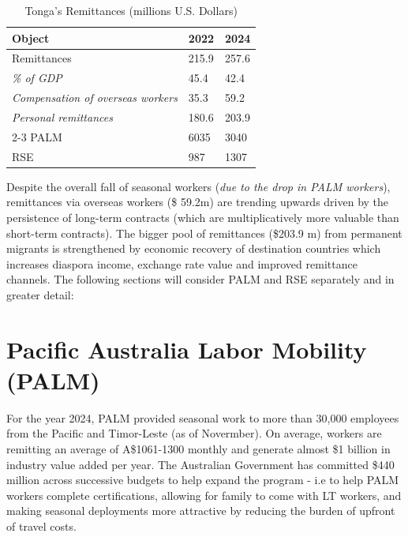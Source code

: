 \documentclass[9pt,a4paper,twocolumn,twoside]{tau-class/tau}
\begin{document}
    	        \begin{table}[H]
            \centering
            \caption{Tonga's Remittances (millions U.S. Dollars)}
            \label{tab:table}
            \begin{tabular}{lll}
                \toprule
                \textbf{Object} & \textbf{2022} & \textbf{2024}
                \\
                \midrule
                Remittances & 215.9 & 257.6 \\
                \hspace{5mm} \textit{\% of GDP} & 45.4 & 42.4 \\
                \hspace{5mm} \textit{Compensation of overseas workers} & 35.3 & 59.2 \\
               \hspace{5mm}  \textit{Personal remittances} & 180.6 & 203.9 \\
               \cline{2-3}
               PALM & 6035 & 3040 \\
               RSE & 987 & 1307 \\
                \bottomrule     
            \end{tabular}
			
			
        \end{table}

        Despite the overall fall of seasonal workers (\textit{due to the drop in PALM workers}), remittances via overseas workers (\$ 59.2m) are trending upwards driven by the persistence of long-term contracts (which are multiplicatively more valuable than short-term contracts). The bigger pool of remittances (\$203.9 m) from permanent migrants is strengthened by economic recovery of destination countries which increases diaspora income, exchange rate value and improved remittance channels. The following sections will consider PALM and RSE separately and in greater detail:

        
\section{Pacific Australia Labor Mobility (PALM)}

	\begin{tauenv}[frametitle=Background]
  For the year 2024, PALM provided seasonal work to more than 30,000 employees from the Pacific and Timor-Leste (as of Novermber). On average, workers are remitting an average of A\$1061-1300 monthly and generate almost \$1 billion in industry value added per year. The Australian Government has committed \$440 million across successive budgets to help expand the program -  i.e to help PALM workers complete certifications, allowing for family to come with LT workers, and making seasonal deployments more attractive by reducing the burden of upfront of travel costs.
                 	\end{tauenv}
\end{document}
